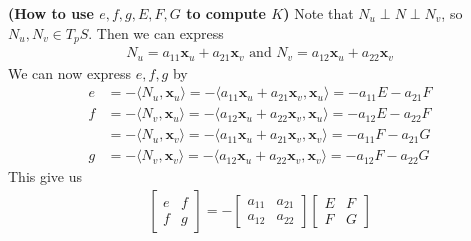 \documentclass{report}
\begin{document}
\begin{mdframed}
  \textbf{(How to use $e,f,g,E,F,G$ to compute  $K$)}
Note that $N_u\perp N \perp N_v$, so $N_u,N_v \in T_pS$. Then we can express 
\begin{align*}
N_u = a_{11}\textbf{x}_u + a_{21}\textbf{x}_v \text{ and }N_v= a_{12}\textbf{x}_u + a_{22}\textbf{x}_v
\end{align*}
We can now express $e,f,g$ by 
 \begin{align*}
e&=-\langle N_u,\textbf{x}_u\rangle = -\langle a_{11}\textbf{x}_u +a_{21}\textbf{x}_v , \textbf{x}_u \rangle = -a_{11}E -a_{21}F\\
f&=-\langle N_v,\textbf{x}_u\rangle = -\langle a_{12}\textbf{x}_u +a_{22}\textbf{x}_v, \textbf{x}_u\rangle = -a_{12}E - a_{22}F   \\
&= -\langle N_u ,\textbf{x}_v\rangle =- \langle a_{11}\textbf{x}_u +a_{21}\textbf{x}_v, \textbf{x}_v\rangle =- a_{11}F- a_{21}G   \\
g&= - \langle N_v,\textbf{x}_v\rangle = -\langle a_{12}\textbf{x}_u + a_{22}\textbf{x}_v, \textbf{x}_v\rangle = - a_{12}F-a_{22}G
\end{align*}
This give us 
\begin{align}
\label{dN1}
\begin{bmatrix}
  e & f \\
  f & g
\end{bmatrix}= - \begin{bmatrix}
  a_{11} & a_{21} \\
  a_{12} & a_{22} 
\end{bmatrix}\begin{bmatrix}
 E & F \\
 F & G
\end{bmatrix}
\end{align}


\end{mdframed}
\end{document}
